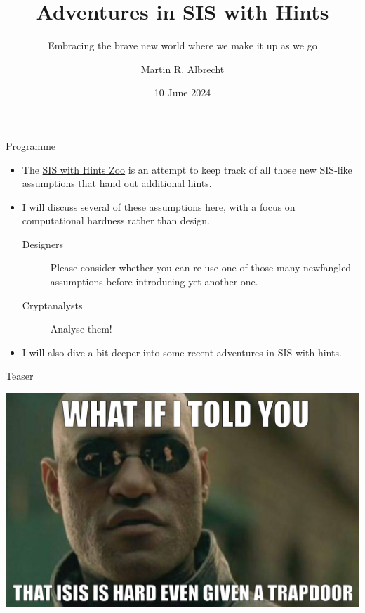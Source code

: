 \documentclass[xcolor=table,10pt,aspectratio=169]{beamer}
\author{Martin R. Albrecht}
\date{10 June 2024}
\title{Adventures in SIS with Hints}
\subtitle{Embracing the brave new world where we make it up as we go}
\begin{document}
\maketitle

\begin{frame}[label={sec:org9517afc}]{Programme}
\begin{itemize}
\item The \href{https://malb.io/sis-with-hints.html}{SIS with Hints Zoo} is an attempt to keep track of all those new SIS-like assumptions that hand out additional hints.

\item I will discuss several of these assumptions here, with a focus on computational hardness rather than design.

\begin{description}
\item[{Designers}] Please consider whether you can re-use one of those many newfangled assumptions before introducing yet another one.

\item[{Cryptanalysts}] Analyse them!
\end{description}

\item I will also dive a bit deeper into some recent adventures in SIS with hints.
\end{itemize}
\end{frame}

\begin{frame}[label={sec:org3833e41}]{Teaser}
\begin{center}
\includegraphics[keepaspectratio,height=.9\textheight]{./sis-with-hints-teaser.jpg}
\end{center}
\end{frame}
\end{document}

